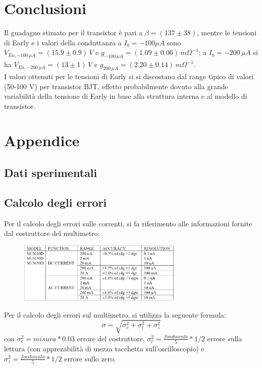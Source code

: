 \documentclass{article}
\begin{document}
\section{Conclusioni}
Il guadagno stimato per il transistor è pari a $\beta=(137\pm38)$, mentre le tensioni di Early e i valori della conduttanza a $I_b=-100 \mu A$ sono $V_{Ea,-100 \,\mu A}=(15.9\pm 0.9) \,V$ e ${g_{-100 \,\mu A}=(1.09 \pm 0.06) \,m\Omega^{-1}}$; a ${I_b=-200 \,\mu A}$ si ha $V_{Ea,-200 \,\mu A}=(13\pm 1) \,V $ e $g_{200 \, \mu A}=(2.20 \pm 0.14) \,m\Omega^{-1}$.\\
I valori ottenuti per le tensioni di Early si si discostano dal range tipico di valori (50-100 V) per transistor BJT, effetto probabilmente dovuto alla grande variabilità della tensione di Early in base alla struttura interna e al modello di transistor.
\newpage
\section{Appendice}

\subsection{Dati sperimentali}


\subsection{Calcolo degli errori}
Per il calcolo degli errori sulle correnti, si fa riferimento alle informazioni fornite dal costruttore del multimetro:
\begin{figure}[H]
    \centering
    \includegraphics[width=0.7\textwidth]{Errore_multimetro.jpg}
\end{figure}
Per il calcolo degli errori sul multimetro, si utilizza la seguente formula:
\begin{equation}
    \sigma=\sqrt{\sigma_c^2+\sigma_l^2+\sigma_z^2}
\end{equation}
con $\sigma_c^2 = misura*0.03$ errore del costruttore, $\sigma_l^2= \frac{fondo scala}{5}*1/2$ errore sulla lettura (con apprezabilità di mezza tacchetta sull'oscilloscopio) e $\sigma_z^2= \frac{fondo scala}{5}*1/2$ errore sullo zero.
\end{document}
